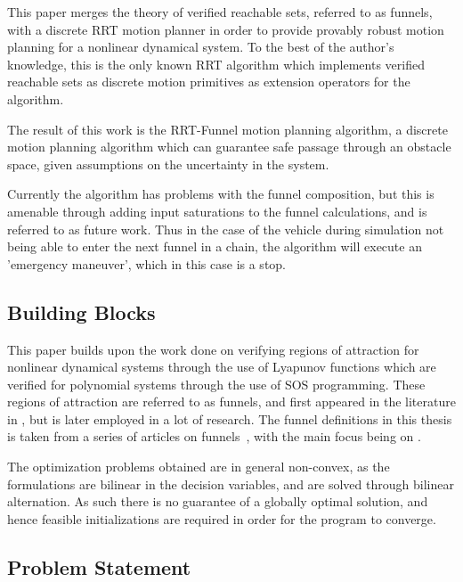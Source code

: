 This paper merges the theory of verified reachable sets, referred to as funnels,
with a discrete \ac{RRT} motion planner in order to provide provably robust
motion planning for a nonlinear dynamical system. To the best of the author's
knowledge, this is the only known \ac{RRT} algorithm which implements verified
reachable sets as discrete motion primitives as extension operators for the
algorithm.

The result of this work is the RRT-Funnel motion planning algorithm, a discrete
motion planning algorithm which can guarantee safe passage through an obstacle
space, given assumptions on the uncertainty in the system.

Currently the algorithm has problems with the funnel composition, but this is
amenable through adding input saturations to the funnel calculations, and is
referred to as future work. Thus in the case of the vehicle during simulation
not being able to enter the next funnel in a chain, the algorithm will execute
an 'emergency maneuver', which in this case is a stop.

\subsection{Building Blocks}

This paper builds upon the work done on verifying regions of attraction for
nonlinear dynamical systems through the use of Lyapunov functions which are
verified for polynomial systems through the use of \ac{SOS} programming. These
regions of attraction are referred to as funnels, and first appeared in the
literature in \cite{masonMechanicsManipulation1985}, but is later employed in a
lot of research. The funnel definitions in this thesis is taken from a series of
articles on funnels~\cite{Tobenkin_2011,tedrakeLQRtreesFeedbackMotion2009,
  majumdarRobustOnlineMotion2013,
  majumdarFunnelLibrariesRealtime2017,ahmadi2014dsos}, with the main focus being
on \cite{majumdarFunnelLibrariesRealtime2017}.

The optimization problems obtained are in general non-convex, as the
formulations are bilinear in the decision variables, and are solved through
bilinear alternation. As such there is no guarantee of a globally optimal
solution, and hence feasible initializations are required in order for the
program to converge.

\subsection{Problem Statement}

